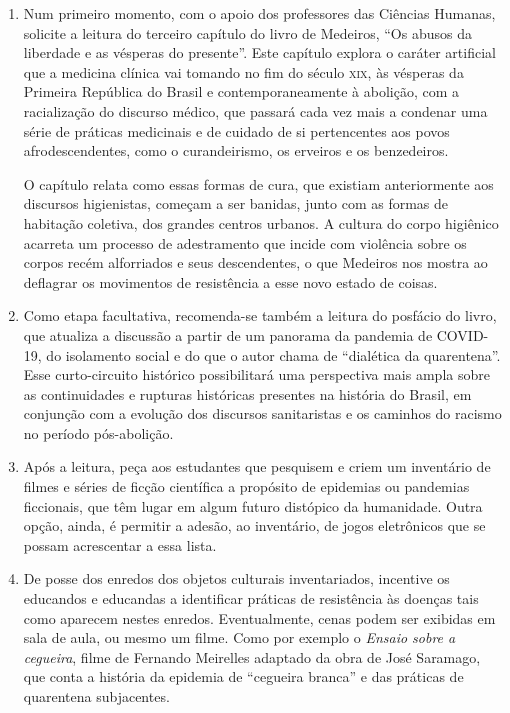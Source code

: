 \documentclass[12pt]{extarticle}
\begin{document}
\begin{enumerate}
\item Num primeiro momento, com o apoio dos professores das Ciências Humanas, 
solicite a leitura do terceiro capítulo do livro
de Medeiros, ``Os abusos da liberdade e as vésperas do presente''. Este
capítulo explora o caráter artificial que a medicina clínica vai tomando
no fim do século \textsc{xix}, às vésperas da Primeira República do Brasil e
contemporaneamente à abolição, com a racialização do discurso médico,
que passará cada vez mais a condenar uma série de práticas medicinais e
de cuidado de si pertencentes aos povos afrodescendentes, como o
curandeirismo, os erveiros e os benzedeiros.

O capítulo relata como essas formas de cura, que existiam anteriormente
aos discursos higienistas, começam a ser banidas, junto com as formas de
habitação coletiva, dos grandes centros urbanos. A cultura do corpo
higiênico acarreta um processo de adestramento que incide com violência
sobre os corpos recém alforriados e seus descendentes, o que Medeiros
nos mostra ao deflagrar os movimentos de resistência a esse novo estado
de coisas.

\item Como etapa facultativa, recomenda-se também a leitura do posfácio do
livro, que atualiza a discussão a partir de um panorama da pandemia de
COVID-19, do isolamento social e do que o autor chama de ``dialética da
quarentena''. Esse curto-circuito histórico possibilitará uma
perspectiva mais ampla sobre as continuidades e rupturas históricas
presentes na história do Brasil, em conjunção com a evolução dos
discursos sanitaristas e os caminhos do racismo no período pós-abolição.

\item Após a leitura, peça aos estudantes que pesquisem e criem um inventário
de filmes e séries de ficção científica a propósito de epidemias ou
pandemias ficcionais, que têm lugar em algum futuro distópico da
humanidade. Outra opção, ainda, é permitir a adesão, ao inventário, de
jogos eletrônicos que se possam acrescentar a essa lista.

\item De posse dos enredos dos objetos culturais inventariados, incentive os
educandos e educandas a identificar práticas de resistência às doenças
tais como aparecem nestes enredos. Eventualmente, cenas podem ser
exibidas em sala de aula, ou mesmo um filme. Como por exemplo o
\emph{Ensaio sobre a cegueira}, filme de Fernando Meirelles adaptado da
obra de José Saramago, que conta a história da epidemia de ``cegueira
branca'' e das práticas de quarentena subjacentes.


\end{enumerate}
\end{document}

